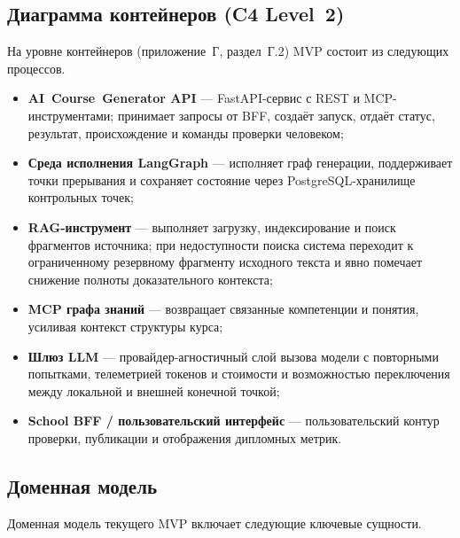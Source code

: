 \subsection{Диаграмма контейнеров (C4 Level~2)}

На уровне контейнеров (приложение~Г, раздел~Г.2) MVP состоит из
следующих процессов.

\begin{itemize}
  \item \textbf{AI~Course~Generator API} — FastAPI-сервис с REST
    и MCP-инструментами; принимает запросы от BFF, создаёт запуск,
    отдаёт статус, результат, происхождение и команды проверки человеком;
  \item \textbf{Среда исполнения LangGraph} — исполняет граф генерации,
    поддерживает точки прерывания и сохраняет состояние через
    PostgreSQL-хранилище контрольных точек;
  \item \textbf{RAG-инструмент} — выполняет загрузку,
    индексирование и поиск фрагментов источника; при недоступности
    поиска система переходит к ограниченному резервному фрагменту исходного текста
    и явно помечает снижение полноты доказательного контекста;
  \item \textbf{MCP графа знаний} — возвращает связанные
    компетенции и понятия, усиливая контекст структуры курса;
  \item \textbf{Шлюз LLM} — провайдер-агностичный слой вызова
    модели с повторными попытками, телеметрией токенов и стоимости
    и возможностью переключения между локальной и внешней конечной точкой;
  \item \textbf{School BFF / пользовательский интерфейс} — пользовательский контур
    проверки, публикации и отображения дипломных метрик.
\end{itemize}

\subsection{Доменная модель}

Доменная модель текущего MVP включает следующие ключевые сущности.

